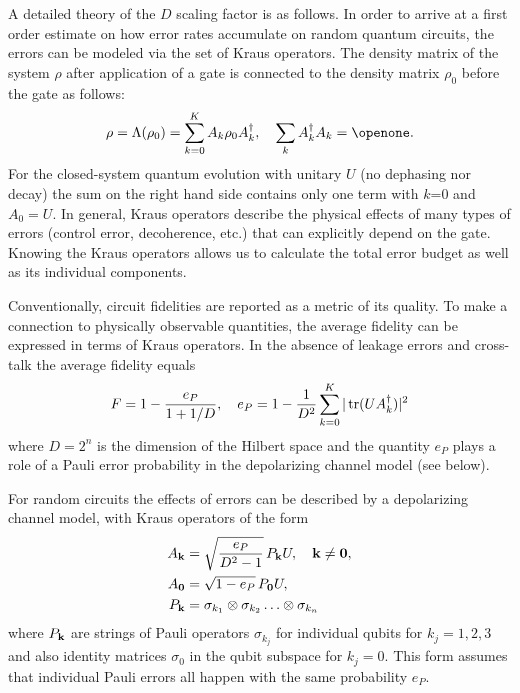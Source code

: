A detailed theory of the $D$ scaling factor is as follows.  In order to arrive at a first order estimate on how error rates accumulate on random quantum circuits, the errors can be modeled via the set of Kraus operators. The density matrix of the system $\rho$ after application of a gate is connected to the density matrix  $\rho_0$ before the gate as follows:
\begin{equation}
\rho=\Lambda(\rho_0)=\sum_{k=0}^{K} A_k \rho_0 A_k^\dagger,\quad \sum_{k} A_k^\dagger A_k=\openone.\label{eq:Kraus}
\end{equation}
For the  closed-system quantum evolution with unitary $U$ (no dephasing nor decay) the sum on the right hand side contains only one term with $k$=0 and  $A_0=U$. In general, Kraus operators describe the physical effects of many types of errors (control error, decoherence, etc.) that can explicitly depend on the gate.  Knowing the Kraus operators allows us to calculate the total  error budget as well as its individual components.

Conventionally, circuit fidelities are reported as a metric of its quality. To make a connection to physically observable quantities, the average fidelity can be expressed in terms of Kraus operators. In the absence of leakage errors and cross-talk the average fidelity equals
\begin{align}
F=1-\frac{e_P}{1+1/D},\quad e_P=1-\frac{1}{D^2}\sum_{k=0}^{K} |\operatorname{tr}(U A_k^\dagger)|^2\label{eq:FA}
\end{align}
where $D=2^n$ is the dimension of the Hilbert space and the quantity $e_P$ plays a role of a Pauli error probability in the depolarizing channel model (see below).
 
For random circuits the effects of errors can be described by a depolarizing channel model, with Kraus operators of the form
\begin{align}
A_{\bf k} &=\sqrt{\frac{ e_P}{D^2-1}} \,  P_{\bf k} U,\quad {\bf k} \neq {\bf 0},\label{eq:DPC}\\
A_{\bf 0} &=\sqrt{1-e_P} \,  P_{\bf 0} U,\nonumber\\
P_{\bf k} &=\sigma_{k_1}\otimes\sigma_{k_2}\ldots\otimes \sigma_{k_n}\nonumber
\end{align}
where $P_{\bf k}$ are strings of Pauli operators $\sigma_{k_j}$  for individual qubits for  $k_j=1,2,3$ and also identity matrices $\sigma_{0}$  in the qubit subspace for $k_j=0$.
This form assumes that individual Pauli errors all happen with the same probability $e_P$.

